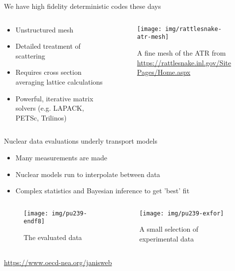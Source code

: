 \documentclass[pdf,aspectratio=169]{beamer}
\begin{document}
\begin{frame}{We have high fidelity deterministic codes these days}
\begin{columns}
    \begin{column}{0.5\textwidth}
        \begin{itemize}
            \item Unstructured mesh
            \item Detailed treatment of scattering
            \item Requires cross section averaging lattice calculations
            \item Powerful, iterative matrix solvers (e.g. LAPACK, PETSc, Trilinos)
        \end{itemize}
    \end{column}
    \begin{column}{0.5\textwidth}
        \begin{figure}[ht]
        \centering
            \texttt{[image: img/rattlesnake-atr-mesh]}
        \caption{\tiny A fine mesh of the ATR from
            \url{https://rattlesnake.inl.gov/SitePages/Home.aspx}}
        \end{figure}
    \end{column}
\end{columns}
\end{frame}

\begin{frame}{Nuclear data evaluations underly transport models}
        \begin{itemize}
            \item Many measurements are made
            \item Nuclear models run to interpolate between data
            \item Complex statistics and Bayesian inference to get 'best' fit
        \end{itemize}
\begin{columns}
    \begin{column}{0.5\textwidth}
        \begin{figure}[ht]
        \centering
        \texttt{[image: img/pu239-endf8]}
        \caption{\small The evaluated data}
        \end{figure}
    \end{column}
    \begin{column}{0.5\textwidth}
        \begin{figure}[ht]
        \centering
            \texttt{[image: img/pu239-exfor]}
        \caption{\small A small selection of experimental data}
        \end{figure}
    \end{column}
\end{columns}
    \centering \tiny \url{https://www.oecd-nea.org/janisweb}
\end{frame}
\end{document}
